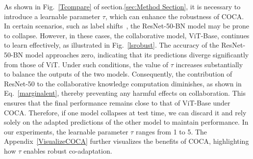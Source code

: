 
As shown in Fig.~\ref{Tcompare} of section.\ref{sec:Method Section}, it is necessary to introduce a learnable parameter $\tau$, which can enhance the robustness of COCA. In certain scenarios, such as label shifts~\cite{niu2023towards}, the ResNet-50-BN model may be prone to collapse. However, in these cases, the collaborative model, ViT-Base, continues to learn effectively, as illustrated in Fig.~\ref{lsrobust}. The accuracy of the ResNet-50-BN model approaches zero, indicating that its predictions diverge significantly from those of ViT. Under such conditions, the value of $\tau$ increases substantially to balance the outputs of the two models. Consequently, the contribution of ResNet-50 to the collaborative knowledge computation diminishes, as shown in Eq.~\ref{marginalent}, thereby preventing any harmful effects on collaboration. This ensures that the final performance remains close to that of ViT-Base under COCA. Therefore, if one model collapses at test time, we can discard it and rely solely on the adapted predictions of the other model to maintain performance. In our experiments, the learnable parameter $\tau$ ranges from 1 to 5. The Appendix~\ref{VisualizeCOCA} further visualizes the benefits of COCA, highlighting how $\tau$ enables robust co-adaptation.

\vspace{-10pt}

